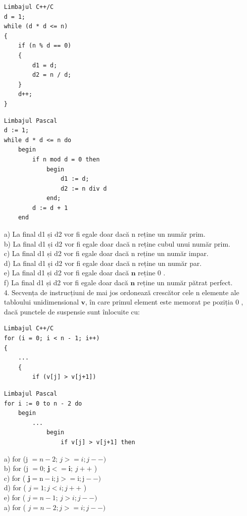 \documentclass[10pt]{article}
\begin{document}
\begin{verbatim}
Limbajul C++/C
d = 1;
while (d * d <= n)
{
    if (n % d == 0)
    {
        d1 = d;
        d2 = n / d;
    }
    d++;
}
\end{verbatim}

\begin{verbatim}
Limbajul Pascal
d := 1;
while d * d <= n do
    begin
        if n mod d = 0 then
            begin
                d1 := d;
                d2 := n div d
            end;
        d := d + 1
    end
\end{verbatim}

a) La final d1 și d2 vor fi egale doar dacă n reține un număr prim.\\
b) La final d1 și d2 vor fi egale doar dacă n reține cubul unui număr prim.\\
c) La final d1 și d2 vor fi egale doar dacă n reține un număr impar.\\
d) La final d1 ș̦i d2 vor fi egale doar dacă n reține un număr par.\\
e) La final d1 și d2 vor fi egale doar dacă $\mathbf{n}$ reține 0 .\\
f) La final d1 și d2 vor fi egale doar dacă $\mathbf{n}$ reține un număr pătrat perfect.\\
4. Secvența de instrucțiuni de mai jos ordonează crescător cele n elemente ale tabloului unidimensional $\mathbf{v}$, în care primul element este memorat pe poziția 0 , dacă punctele de suspensie sunt înlocuite cu:

\begin{verbatim}
Limbajul C++/C
for (i = 0; i < n - 1; i++)
{
    ...
    {
        if (v[j] > v[j+1])
\end{verbatim}

\begin{verbatim}
Limbajul Pascal
for i := 0 to n - 2 do
    begin
        ...
            begin
                if v[j] > v[j+1] then
\end{verbatim}

a) for (j $=n-2$; $j>=i ; j--)$\\
b) for (j $=0$; $\mathbf{j}<=\mathbf{i} ; ~ j++$ )\\
c) for ( $\mathbf{j}=\mathrm{n}-\mathrm{i} ; \mathrm{j}>=\mathrm{i} ; \mathrm{j}-\mathrm{-})$\\
d) for ( $j=1 ; j<i ; j++$ )\\
e) for ( $j=n-1$; $j>i ; j--)$\\
a) for ( $j=n-2 ; j>=i ; j--)$
\end{document}
